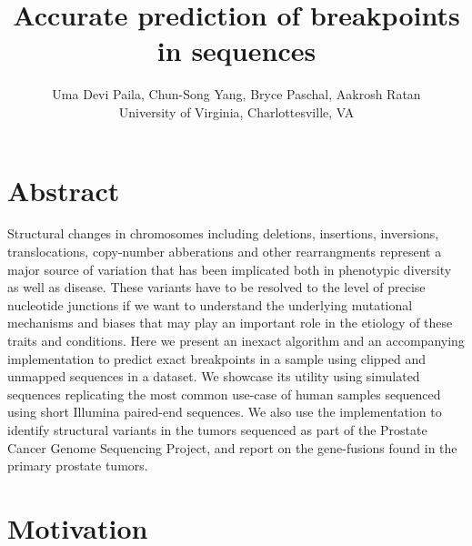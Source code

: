 \documentclass[a0,final]{a0poster}
\title{Accurate prediction of breakpoints in sequences}
\author{Uma Devi Paila, Chun-Song Yang, Bryce Paschal, Aakrosh Ratan\\
University of Virginia, Charlottesville, VA}
\begin{document}
\hspace{-3cm}						%
\colorbox{boxcol}{					%
\begin{minipage}{1189mm}		    %
\maketitle
\end{minipage}
}
\vspace{1cm}

\setlength{\columnseprule}{3pt}
\begin{multicols}{3}						%
\raggedcolumns							    %

\section*{Abstract}
Structural changes in chromosomes including deletions, insertions, inversions,
translocations, copy-number abberations and other rearrangments represent a
major source of variation that has been implicated both in phenotypic diversity
as well as disease. These variants have to be resolved to the level of precise
nucleotide junctions if we want to understand the underlying mutational
mechanisms and biases that may play an important role in the etiology of these
traits and conditions. Here we present an inexact algorithm and an accompanying
implementation to predict exact breakpoints in a sample using clipped and
unmapped sequences in a dataset. We showcase its utility using simulated
sequences replicating the most common use-case of human samples sequenced using
short Illumina paired-end sequences.  We also use the implementation to identify
structural variants in the tumors sequenced as part of the Prostate Cancer
Genome Sequencing Project, and report on the gene-fusions found in the primary
prostate tumors.

\section*{Motivation}


\end{multicols}
\end{document}
